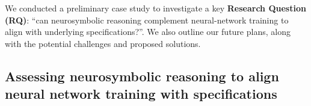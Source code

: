 
We conducted a preliminary case study to investigate a key \textbf{Research Question (RQ)}: ``can neurosymbolic reasoning complement neural-network training to align with underlying specifications?''. We also outline our future plans, along with the potential challenges and proposed solutions. %


\subsection{Assessing neurosymbolic reasoning to align neural network training with specifications}
\label{sec:symbolicReasoning}

